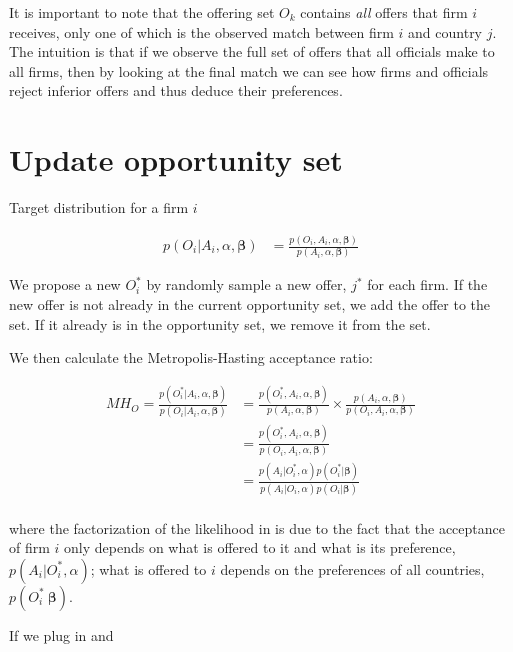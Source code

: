 \documentclass[12pt]{article}
\begin{document}
It is important to note that the offering set $O_k$ contains \textit{all} offers that firm $i$ receives, only one of which is the observed match between firm $i$ and country $j$. The intuition is that if we observe the full set of offers that all officials make to all firms, then by looking at the final match we can see how firms and officials reject inferior offers and thus deduce their preferences.

\section{Update opportunity set}

Target distribution for a firm $i$ 

\begin{align}
p(O_i | A_i, \alpha, \bm{\beta}) &= \frac{p(O_i, A_i, \alpha, \bm{\beta})}{p(A_i, \alpha, \bm{\beta})}
\end{align}

We propose a new $O_i^*$ by randomly sample a new offer, $j^*$ for each firm. If the new offer is not already in the current opportunity set, we add the offer to the set. If it already is in the opportunity set, we remove it from the set.

We then calculate the Metropolis-Hasting acceptance ratio:

\begin{align}
MH_O = \frac{p(O_i^* | A_i, \alpha, \bm{\beta})}{p(O_i | A_i, \alpha, \bm{\beta})} &= \frac{p(O_i^*, A_i, \alpha, \bm{\beta})}{p(A_i, \alpha, \bm{\beta})} \times \frac{p(A_i, \alpha, \bm{\beta})}{p(O_i, A_i, \alpha, \bm{\beta})} \\
&= \frac{p(O_i^*, A_i, \alpha, \bm{\beta})}{p(O_i, A_i, \alpha, \bm{\beta})} \\
&= \frac{p(A_i | O_i^*, \alpha)p(O_i^*|\bm{\beta})}{p(A_i | O_i, \alpha)p(O_i|\bm{\beta})} \label{eq:updateO_joint_dist_into_conditional_dist} \\
\end{align}

where the factorization of the likelihood in  is due to the fact that the acceptance of firm $i$ only depends on what is offered to it and what is its preference, $p(A_i | O_i^*, \alpha)$; what is offered to $i$ depends on the preferences of all countries, $p(O_i^* \ \bm{\beta})$.

If we plug in  and 
\end{document}
